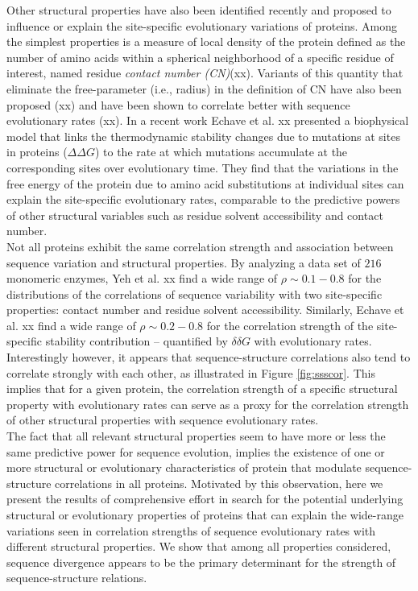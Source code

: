 \documentclass[11pt]{article}
\begin{document}
    Other structural properties have also been identified recently and proposed to influence or explain the site-specific evolutionary variations of proteins. Among the simplest properties is a measure of local density of the protein defined as the number of amino acids within a spherical neighborhood of a specific residue of interest, named residue {\it contact number (CN)}(xx). Variants of this quantity that eliminate the free-parameter (i.e., radius) in the definition of CN have also been proposed (xx) and have been shown to correlate better with sequence evolutionary rates (xx). In a recent work Echave et al. xx presented a biophysical model that links the thermodynamic stability changes due to mutations at sites in proteins ($\Delta\Delta G$) to the rate at which mutations accumulate at the corresponding sites over evolutionary time. They find that the variations in the free energy of the protein due to amino acid substitutions at individual sites can explain the site-specific evolutionary rates, comparable to the predictive powers of other structural variables such as residue solvent accessibility and contact number.
    \\

    Not all proteins exhibit the same correlation strength and association between sequence variation and structural properties. By analyzing a data set of $216$ monomeric enzymes, Yeh et al. xx find a wide range of $\rho\sim0.1-0.8$ for the distributions of the correlations of sequence variability with two site-specific properties: contact number and residue solvent accessibility. Similarly, Echave et al. xx find a wide range of $\rho\sim0.2-0.8$ for the correlation strength of the site-specific stability contribution -- quantified by $\delta\delta G$ with evolutionary rates. Interestingly however, it appears that sequence-structure correlations also tend to correlate strongly with each other, as illustrated in Figure \ref{fig:ssscor}. This implies that for a given protein, the correlation strength of a specific structural property with evolutionary rates can serve as a proxy for the correlation strength of other structural properties with sequence evolutionary rates.
    \\

    The fact that all relevant structural properties seem to have more or less the same predictive power for sequence evolution, implies the existence of one or more structural or evolutionary characteristics of protein that modulate sequence-structure correlations in all proteins. Motivated by this observation, here we present the results of comprehensive effort in search for the potential underlying structural or evolutionary properties of proteins that can explain the wide-range variations seen in correlation strengths of sequence evolutionary rates with different structural properties.  We show that among all properties considered, sequence divergence appears to be the primary determinant for the strength of sequence-structure relations.
    \\
\end{document}
